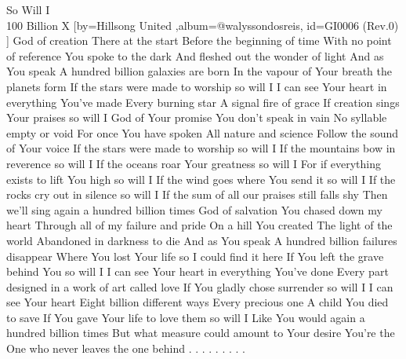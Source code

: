 \beginsong
{So Will I\\100 Billion X %
}[by={Hillsong United %
},album={@walyssondosreis},
id={GI0006 %
(Rev.0) %
}]
\beginverse
God of creation
There at the start
Before the beginning of time
With no point of reference
You spoke to the dark
And fleshed out the wonder of light
\endverse
\beginchorus
And as You speak
A hundred billion galaxies are born
In the vapour of Your breath the planets form
If the stars were made to worship so will I
I can see Your heart in everything You've made
Every burning star
A signal fire of grace
If creation sings Your praises so will I
\endchorus
\beginverse
God of Your promise
You don't speak in vain
No syllable empty or void
For once You have spoken
All nature and science
Follow the sound of Your voice
\endverse
\beginverse
If the stars were made to worship so will I
If the mountains bow in reverence so will I
If the oceans roar Your greatness so will I
For if everything exists to lift You high so will I
If the wind goes where You send it so will I
If the rocks cry out in silence so will I
If the sum of all our praises still falls shy
Then we'll sing again a hundred billion times
\endverse
\beginverse
God of salvation
You chased down my heart
Through all of my failure and pride
On a hill You created
The light of the world
Abandoned in darkness to die
\endverse
\beginverse
And as You speak
A hundred billion failures disappear
Where You lost Your life so I could find it here
If You left the grave behind You so will I
I can see Your heart in everything You've done
Every part designed in a work of art called love
If You gladly chose surrender so will I
I can see Your heart
Eight billion different ways
Every precious one
A child You died to save
If You gave Your life to love them so will I
\endverse
\beginverse
Like You would again a hundred billion times
But what measure could amount to Your desire
You're the One who never leaves the one behind
\endverse
\beginverse*
.
.
.
.
.
.
.
.
.
